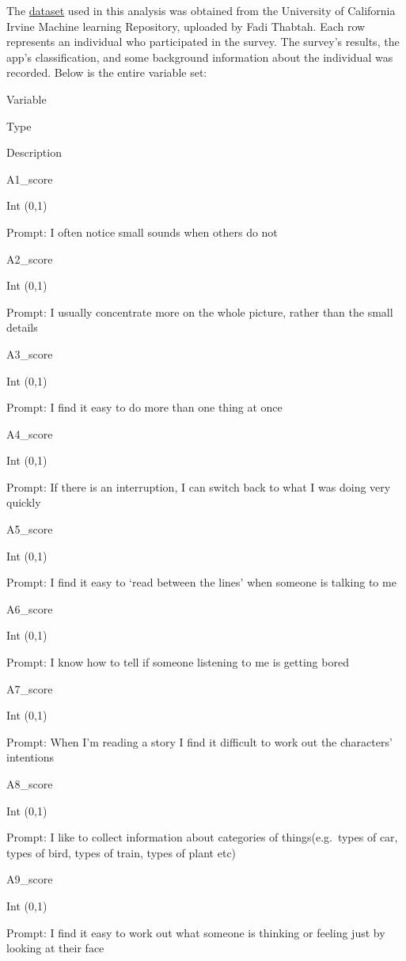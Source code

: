 \documentclass[
]{article}
\begin{document}
The
\href{https://archive.ics.uci.edu/ml/datasets/Autism+Screening+Adult}{dataset}
used in this analysis was obtained from the University of California
Irvine Machine learning Repository, uploaded by Fadi Thabtah. Each row
represents an individual who participated in the survey. The survey's
results, the app's classification, and some background information about
the individual was recorded. Below is the entire variable set:

Variable

Type

Description

A1\_score

Int (0,1)

Prompt: I often notice small sounds when others do not

A2\_score

Int (0,1)

Prompt: I usually concentrate more on the whole picture, rather than the
small details

A3\_score

Int (0,1)

Prompt: I find it easy to do more than one thing at once

A4\_score

Int (0,1)

Prompt: If there is an interruption, I can switch back to what I was
doing very quickly

A5\_score

Int (0,1)

Prompt: I find it easy to `read between the lines' when someone is
talking to me

A6\_score

Int (0,1)

Prompt: I know how to tell if someone listening to me is getting bored

A7\_score

Int (0,1)

Prompt: When I'm reading a story I find it difficult to work out the
characters' intentions

A8\_score

Int (0,1)

Prompt: I like to collect information about categories of
things(e.g.~types of car, types of bird, types of train, types of plant
etc)

A9\_score

Int (0,1)

Prompt: I find it easy to work out what someone is thinking or feeling
just by looking at their face
\end{document}
